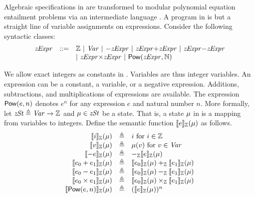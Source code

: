 Algebraic specifications in \bvdsl are transformed to modular polynomial equation entailment problems via an intermediate language \zdsl.
A program in \zdsl is but a straight line of variable assignments on expressions.
Consider the following syntactic classes:
\[
\begin{array}{rcl}
  \mathit{zExpr} & ::= & \mathbb{Z} \ |\ \mathit{Var} \ |\  {-}\mathit{zExpr} \ |\
                 \mathit{zExpr} {+} \mathit{zExpr} \ |\ \mathit{zExpr} {-} \mathit{zExpr} \\
  & & |\ \mathit{zExpr} {\times} \mathit{zExpr}  \ |\ \mbox{\textsf{Pow}} (\mathit{zExpr}, \mathbb{N})
\end{array}
\]

We allow exact integers as constants in \zdsl.
Variables are thus integer variables. An expression can be a
constant, a variable, or a negative expression. Additions, subtractions,
and multiplications of expressions are available.
The expression $\mbox{\textsf{Pow}}(e, n)$ denotes $e^n$ for any expression $e$ and natural number $n$.
More formally, let $\mathit{zSt} \triangleq \mathit{Var} \rightarrow
\mathbb{Z}$ and $\mu \in \mathit{zSt}$ be a state. That is,
a {state} $\mu$ in \zdsl is a mapping from variables to integers. Define the
semantic function $[\![{e}]\!]_{\mathbb{Z}}(\mu)$ as follows.
\[
\begin{array}{rcl}
  \zvalueof{{i}}(\zst) & \defn & i \textmd{  for ${i} \in \bbfZ$} \\
  \zvalueof{{v}}(\zst) & \defn & \zst({v}) \textmd{  for ${v} \in \Var$} \\
  \zvalueof{-e}(\zst) & \defn & -_{\bbfZ}\zvalueof{e}(\zst) \\
  \zvalueof{e_0 + e_1}(\zst) & \defn & \zvalueof{e_0}(\zst) +_{\bbfZ} \zvalueof{e_1}(\zst) \\
  \zvalueof{e_0 - e_1}(\zst) & \defn & \zvalueof{e_0}(\zst) -_{\bbfZ} \zvalueof{e_1}(\zst) \\
  \zvalueof{e_0 \times e_1}(\zst) & \defn & \zvalueof{e_0}(\zst) \times_{\bbfZ} \zvalueof{e_1}(\zst) \\
  \zvalueof{\dslcode{Pow}(e, n)}(\zst) & \defn & (\zvalueof{e}(\zst))^n
\end{array}
\]


